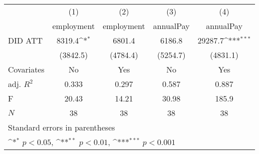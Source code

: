 {
\def\sym#1{\ifmmode^{#1}\else\(^{#1}\)\fi}
\begin{tabular}{l*{4}{c}}
\hline\hline
            &\multicolumn{1}{c}{(1)}&\multicolumn{1}{c}{(2)}&\multicolumn{1}{c}{(3)}&\multicolumn{1}{c}{(4)}\\
            &\multicolumn{1}{c}{employment}&\multicolumn{1}{c}{employment}&\multicolumn{1}{c}{annualPay}&\multicolumn{1}{c}{annualPay}\\
\hline
DID ATT     &      8319.4\sym{*}  &      6801.4         &      6186.8         &     29287.7\sym{***}\\
            &    (3842.5)         &    (4784.4)         &    (5254.7)         &    (4831.1)         \\
[1em]
Covariates  &          No         &         Yes         &          No         &         Yes         \\
\hline
adj. \(R^{2}\)&       0.333         &       0.297         &       0.587         &       0.887         \\
F           &       20.43         &       14.21         &       30.98         &       185.9         \\
\(N\)       &          38         &          38         &          38         &          38         \\
\hline\hline
\multicolumn{5}{l}{\footnotesize Standard errors in parentheses}\\
\multicolumn{5}{l}{\footnotesize \sym{*} \(p<0.05\), \sym{**} \(p<0.01\), \sym{***} \(p<0.001\)}\\
\end{tabular}
}
